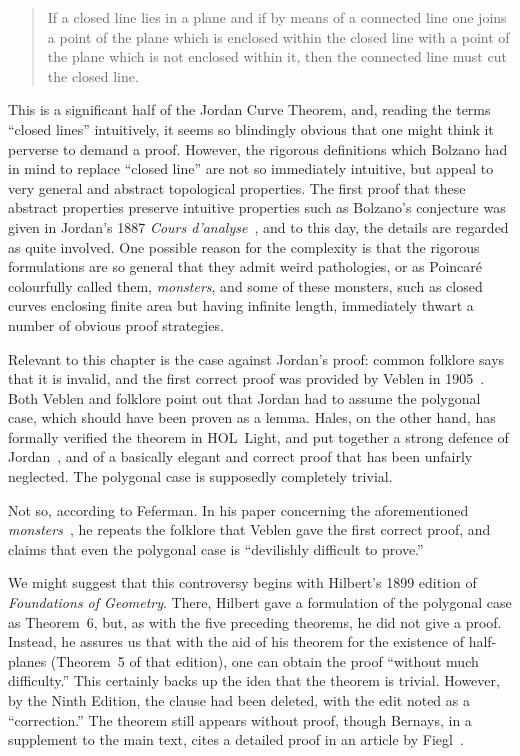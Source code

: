 \begin{quote}
If a closed line lies in a plane and if by means of a connected line one joins a point of the plane which is enclosed within the closed line with a point of the plane which is not enclosed within it, then the connected line must cut the closed line.
\end{quote}

This is a significant half of the Jordan Curve Theorem, and, reading the terms ``closed lines'' intuitively, it seems so blindingly obvious that one might think it perverse to demand a proof. However, the rigorous definitions which Bolzano had in mind to replace ``closed line'' are not so immediately intuitive, but appeal to very general and abstract topological properties. The first proof that these abstract properties preserve intuitive properties such as Bolzano's conjecture was given in Jordan's 1887 \emph{Cours d'analyse}~\cite{JordanTextBook}, and to this day, the details are regarded as quite involved. One possible reason for the complexity is that the rigorous formulations are so general that they admit weird pathologies, or as Poincar\'{e} colourfully called them, \emph{monsters}, and some of these monsters, such as closed curves enclosing finite area but having infinite length, immediately thwart a number of obvious proof strategies.

Relevant to this chapter is the case against Jordan's proof: common folklore says that it is invalid, and the first correct proof was provided by Veblen in 1905~\cite{VeblenJordan}. Both Veblen and folklore point out that Jordan had to assume the polygonal case, which should have been proven as a lemma. Hales, on the other hand, has formally verified the theorem in HOL~Light, and put together a strong defence of Jordan~\cite{HalesJordansProof}, and of a basically elegant and correct proof that has been unfairly neglected. The polygonal case is supposedly completely trivial. 

Not so, according to Feferman. In his paper concerning the aforementioned \emph{monsters}~\cite{IntuitionMonsters}, he repeats the folklore that Veblen gave the first correct proof, and claims that even the polygonal case is ``devilishly difficult to prove.''

We might suggest that this controversy begins with Hilbert's 1899 edition of \emph{Foundations of Geometry}. There, Hilbert gave a formulation of the polygonal case as Theorem~6, but, as with the five preceding theorems, he did not give a proof. Instead, he assures us that with the aid of his theorem for the existence of half-planes (Theorem~5 of that edition), one can obtain the proof ``without much difficulty.'' This certainly backs up the idea that the theorem is trivial. However, by the Ninth Edition, the clause had been deleted, with the edit noted as a ``correction.'' The theorem still appears without proof, though Bernays, in a supplement to the main text, cites a detailed proof in an article by Fiegl~\cite{FeiglJordan}. 

